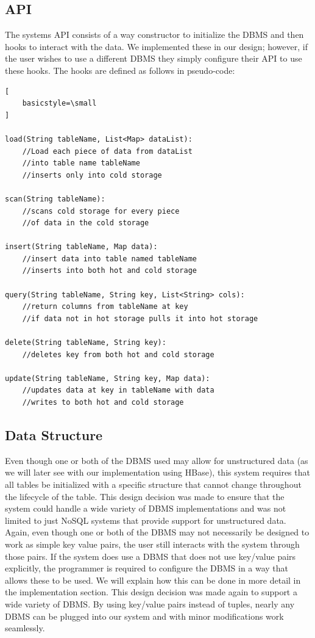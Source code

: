 \documentclass[12pt]{article}
\begin{document}
\subsection{API}
The systems API consists of a way constructor to initialize the DBMS and then hooks to interact with the data. We implemented these in our design; however, if the user wishes to use a different DBMS they simply configure their API to use these hooks. The hooks are defined as follows in pseudo-code:
\begin{lstlisting}[
    basicstyle=\small
]

load(String tableName, List<Map> dataList):
    //Load each piece of data from dataList
    //into table name tableName
    //inserts only into cold storage

scan(String tableName):
    //scans cold storage for every piece 
    //of data in the cold storage

insert(String tableName, Map data):
    //insert data into table named tableName
    //inserts into both hot and cold storage

query(String tableName, String key, List<String> cols):
    //return columns from tableName at key
    //if data not in hot storage pulls it into hot storage

delete(String tableName, String key):
    //deletes key from both hot and cold storage

update(String tableName, String key, Map data):
    //updates data at key in tableName with data
    //writes to both hot and cold storage

\end{lstlisting}

\subsection{Data Structure}
Even though one or both of the DBMS used may allow for unstructured data (as we will later see with our implementation using HBase), this system requires that all tables be initialized with a specific structure that cannot change throughout the lifecycle of the table. This design decision was made to ensure that the system could handle a wide variety of DBMS implementations and was not limited to just NoSQL systems that provide support for unstructured data. 
Again, even though one or both of the DBMS may not necessarily be designed to work as simple key value pairs, the user still interacts with the system through those pairs. If the system does use a DBMS that does not use key/value pairs explicitly, the programmer is required to configure the DBMS in a way that allows these to be used. We will explain how this can be done in more detail in the implementation section. This design decision was made again to support a wide variety of DBMS. By using key/value pairs instead of tuples, nearly any DBMS can be plugged into our system and with minor  modifications work seamlessly.
\end{document}
